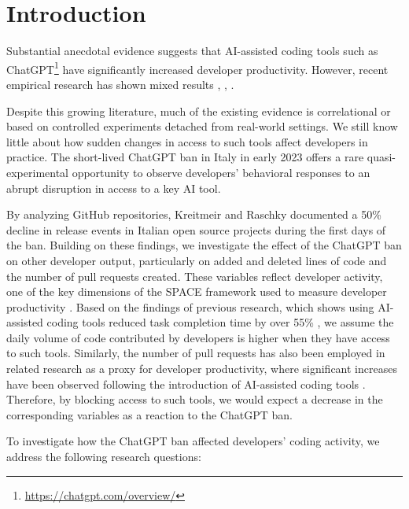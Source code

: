 \section{Introduction}

Substantial anecdotal evidence suggests that AI-assisted coding tools such as ChatGPT\footnote{\url{https://chatgpt.com/overview/}} have significantly increased developer productivity. However, recent empirical research has shown mixed results \cite[p.~12]{cui2025the}, \cite[p.~2]{paradis2024doesaiimpactdevelopment}, \cite[p.~5]{peng2023impactaideveloperproductivity} \cite[p.~2]{becker2025measuringimpactearly2025ai}.

Despite this growing literature, much of the existing evidence is correlational or based on controlled experiments detached from real-world settings. We still know little about how sudden changes in access to such tools affect developers in practice. The short-lived ChatGPT ban in Italy in early 2023 \cite{garante_ban_2023} offers a rare quasi-experimental opportunity to observe developers' behavioral responses to an abrupt disruption in access to a key AI tool.

By analyzing GitHub repositories, Kreitmeir and Raschky \cite[p.~7]{Kreitmeir2023} documented a 50\% decline in release events in Italian open source projects during the first days of the ban. Building on these findings, we investigate the effect of the ChatGPT ban on other developer output, particularly on added and deleted lines of code and the number of pull requests created. These variables reflect developer activity, one of the key dimensions of the SPACE framework used to measure developer productivity \cite[pp.~49--50]{forsgren2021the}. Based on the findings of previous research, which shows using AI-assisted coding tools reduced task completion time by over 55\% \cite[p.~5]{peng2023impactaideveloperproductivity}, we assume the daily volume of code contributed by developers is higher when they have access to such tools. Similarly, the number of pull requests has also been employed in related research as a proxy for developer productivity, where significant increases have been observed following the introduction of AI-assisted coding tools \cite[pp.~6, 12]{cui2025the}. Therefore, by blocking access to such tools, we would expect a decrease in the corresponding variables as a reaction to the ChatGPT ban.

To investigate how the ChatGPT ban affected developers' coding activity, we address the following research questions:


